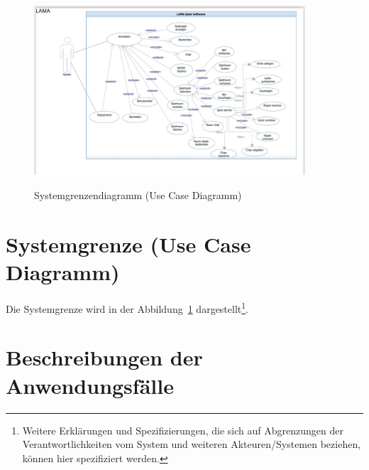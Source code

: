 \begin{figure}
\centering	
\includegraphics[width=0.9\textwidth]{img/UseCase1.jpeg}
\label{fig:sys}
\caption{Systemgrenzendiagramm (Use Case Diagramm)}
\end{figure}

\section{Systemgrenze (Use Case Diagramm)}

Die Systemgrenze wird in der Abbildung~\ref{fig:sys} dargestellt\footnote{Weitere Erklärungen und Spezifizierungen, die sich auf Abgrenzungen der Verantwortlichkeiten vom System und weiteren Akteuren/Systemen beziehen, können hier spezifiziert werden.}. 


\section{Beschreibungen der Anwendungsfälle}

\setcounter{uc}{10}

